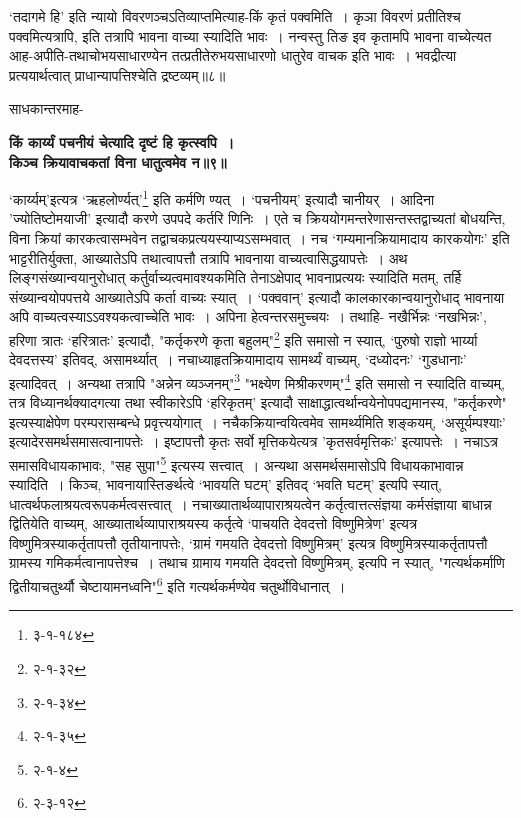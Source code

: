 {{ `तदागमे हि' इति न्यायो विवरणञ्चऽतिव्याप्तमित्याह-किं कृतं पक्वमिति~।
कृञा विवरणं प्रतीतिश्च पक्वमित्यत्रापि, इति तत्रापि भावना वाच्या स्यादिति भावः~।
 नन्वस्तु तिङ इव कृतामपि भावना वाच्येत्यत आह-अपीति-तथाचोभयसाधारण्येन तत्प्रतीतेरुभयसाधारणो धातुरेव वाचक इति भावः~।
भवद्रीत्या प्रत्ययार्थत्वात् प्राधान्यापत्तिश्चेति द्रष्टव्यम्॥८॥\par
 साधकान्तरमाह-
\begin{center}{\bfseries किं कार्य्यं पचनीयं चेत्यादि दृष्टं हि कृत्स्वपि~।\\
किञ्च क्रियावाचकतां विना धातुत्वमेव न॥९॥}
\end{center}
 `कार्य्यम्'इत्यत्र `ऋहलोर्ण्यत्'\footnote{३-१-१८४} इति कर्मणि ण्यत्~।
`पचनीयम्' इत्यादौ चानीयर्~।
आदिना 'ज्योतिष्टोमयाजी' इत्यादौ करणे उपपदे कर्तरि णिनिः~।
एते च क्रिययोगमन्तरेणासन्तस्तद्वाच्यतां बोधयन्ति, विना क्रियां कारकत्वासम्भवेन तद्वाचकप्रत्ययस्याप्यऽसम्भवात्~।
नच `गम्यमानक्रियामादाय कारकयोगः' इति भाट्टरीतिर्युक्ता, आख्यातेऽपि तथात्वापत्तौ तत्रापि भावनाया वाच्यत्वासिद्धयापत्तेः~।
 अथ लिङ्गसंख्यान्वयानुरोधात् कर्तुर्वाच्यत्वमावश्यकमिति तेनाऽक्षेपाद् भावनाप्रत्ययः स्यादिति मतम्, तर्हि संख्यान्वयोपपत्तये आख्यातेऽपि कर्ता वाच्यः स्यात्~।
`पक्ववान्' इत्यादौ कालकारकान्वयानुरोधाद् भावनाया अपि वाच्यत्वस्याऽऽवश्यकत्वाच्चेति भावः~।
 अपिना हेत्वन्तरसमुच्चयः~।
तथाहि- नखैर्भिन्नः `नखभिन्नः', हरिणा त्रातः `हरित्रातः' इत्यादौ, "कर्तृकरणे कृता बहुलम्"\footnote{२-१-३२} इति समासो न स्यात्, `पुरुषो राज्ञो भार्य्या देवदत्तस्य' इतिवद्, असामर्थ्यात्~।
नचाध्याहृतक्रियामादाय सामर्थ्यं वाच्यम्, `दध्योदनः' `गुडधानाः' इत्यादिवत्~।
अन्यथा तत्रापि "अन्नेन व्यञ्जनम्"\footnote{२-१-३४} "भक्ष्येण मिश्रीकरणम्"\footnote{२-१-३५} इति समासो न स्यादिति वाच्यम्, तत्र विध्यानर्थक्यादगत्या तथा स्वीकारेऽपि `हरिकृतम्' इत्यादौ साक्षाद्धात्वर्थान्वयेनोपपद्यमानस्य, "कर्तृकरणे" इत्यस्याक्षेपेण परम्परासम्बन्धे प्रवृत्त्ययोगात्~।
 नचैकक्रियान्वयित्वमेव सामर्थ्यमिति शङ्कयम्, `असूर्यम्पश्याः' इत्यादेरसमर्थसमासत्वानापत्तेः~।
इष्टापत्तौ कृतः सर्वो मृत्तिकयेत्यत्र 'कृतसर्वमृत्तिकः' इत्यापत्तेः~।
नचाऽत्र समासविधायकाभावः, "सह सुपा"\footnote{२-१-४} इत्यस्य सत्त्वात्~।
अन्यथा असमर्थसमासोऽपि विधायकाभावान्न स्यादिति~।
 किञ्च, भावनायास्तिङर्थत्वे `भावयति घटम्' इतिवद् `भवति घटम्' इत्यपि स्यात्, धात्वर्थफलाश्रयत्वरूपकर्मत्वसत्त्वात्~।
नचाख्यातार्थव्यापाराश्रयत्वेन कर्तृत्वात्तत्संज्ञया कर्मसंज्ञाया बाधान्न द्वितियेति वाच्यम्, आख्यातार्थव्यापाराश्रयस्य कर्तृत्वे `पाचयति देवदत्तो विष्णुमित्रेण' इत्यत्र विष्णुमित्रस्याकर्तृतापत्तौ तृतीयानापत्तेः, `ग्रामं गमयति देवदत्तो विष्णुमित्रम्' इत्यत्र विष्णुमित्रस्याकर्तृतापत्तौ ग्रामस्य गमिकर्मत्वानापत्तेश्च~।
तथाच ग्रामाय गमयति देवदत्तो विष्णुमित्रम्, इत्यपि न स्यात्, "गत्यर्थकर्माणि द्वितीयाचतुर्थ्यौ चेष्टायामनध्वनि"\footnote{२-३-१२} इति गत्यर्थकर्मण्येव चतुर्थोविधानात्~।
}}
